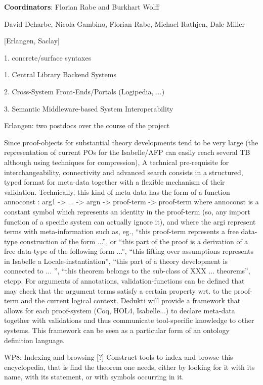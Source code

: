 {\bf Coordinators}: Florian Rabe and Burkhart Wolff

David Deharbe, Nicola Gambino, Florian Rabe, Michael Rathjen,
Dale Miller



[Erlangen, Saclay]


1. concrete/surface syntaxes 

1. Central Library Backend Systems 

2. Cross-System Front-Ends/Portals (Logipedia, ...)

3. Semantic Middleware-based System Interoperability 

Erlangen: two postdocs over the course of the project

Since proof-objects for substantial theory developments tend to be
very large (the representation of current POs for the Isabelle/AFP can
easily reach several TB although using techniques for compression), A
technical pre-requisite for interchangeability, connectivity and
advanced search consists in a structured, typed format for meta-data
together with a flexible mechanism of their validation. Technically,
this kind of meta-data has the form of a function annoconst : arg1 ->
... -> argn -> proof-term -> proof-term where annoconst is a constant
symbol which represents an identity in the proof-term (so, any import
function of a specific system can actually ignore it), and where the
argi represent terms with meta-information such as, eg., “this
proof-term represents a free data-type construction of the form ...”,
or “this part of the proof is a derivation of a free data-type of the
following form ...”, “this lifting over assumptions represents in
Isabelle a Locale-instantiation”, “this part of a theory
development is connected to ... ”, “this theorem belongs to the
sub-class of XXX ... theorems”, etcpp. For arguments of annotations,
validation-functions can be defined that may check that the argument
terms satisfy a certain property wrt. to the proof-term and the
current logical context. Dedukti will provide a framework that allows
for each proof-system (Coq, HOL4, Isabelle...) to declare meta-data
together with validations and thus communicate tool-specific knowledge
to other systems. This framework can be seen as a particular form of
an ontology definition language.
 
WP8: Indexing and browsing [?]  Construct tools to index and browse
this encyclopedia, that is find the theorem one needs, either by
looking for it with its name, with its statement, or with symbols
occurring in it.
